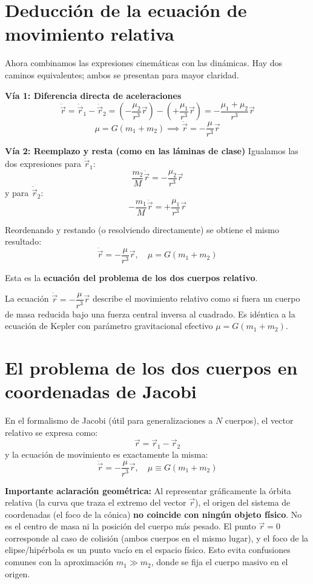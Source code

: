 \documentclass[12pt,oneside]{book}
\begin{document}
\section{Deducción de la ecuación de movimiento relativa}
Ahora combinamos las expresiones cinemáticas con las dinámicas. Hay dos caminos equivalentes; ambos se presentan para mayor claridad.

\textbf{Vía 1: Diferencia directa de aceleraciones}
\[
\ddot{\vec{r}} = \ddot{\vec{r}}_1 - \ddot{\vec{r}}_2 = \left( -\frac{\mu_2}{r^3} \vec{r} \right) - \left( +\frac{\mu_1}{r^3} \vec{r} \right) = -\frac{\mu_1 + \mu_2}{r^3} \vec{r}
\]
\[
\mu = G(m_1 + m_2) \implies \ddot{\vec{r}} = -\frac{\mu}{r^3} \vec{r}
\]

\textbf{Vía 2: Reemplazo y resta (como en las láminas de clase)}
Igualamos las dos expresiones para \(\ddot{\vec{r}}_1\):
\[
\frac{m_2}{M} \ddot{\vec{r}} = -\frac{\mu_2}{r^3} \vec{r}
\]
y para \(\ddot{\vec{r}}_2\):
\[
-\frac{m_1}{M} \ddot{\vec{r}} = +\frac{\mu_1}{r^3} \vec{r}
\]

Reordenando y restando (o resolviendo directamente) se obtiene el mismo resultado:
\[
\ddot{\vec{r}} = -\frac{\mu}{r^3} \vec{r}, \quad \mu = G(m_1 + m_2)
\]

Esta es la \textbf{ecuación del problema de los dos cuerpos relativo}.

\begin{importante}
La ecuación \(\ddot{\vec{r}} = -\dfrac{\mu}{r^3} \vec{r}\) describe el movimiento relativo como si fuera un cuerpo de masa reducida bajo una fuerza central inversa al cuadrado. Es idéntica a la ecuación de Kepler con parámetro gravitacional efectivo \(\mu = G(m_1 + m_2)\).
\end{importante}

\section{El problema de los dos cuerpos en coordenadas de Jacobi}
En el formalismo de Jacobi (útil para generalizaciones a \(N\) cuerpos), el vector relativo se expresa como:
\[
\vec{r} = \vec{r}_1 - \vec{r}_2
\]
y la ecuación de movimiento es exactamente la misma:
\[
\ddot{\vec{r}} = -\frac{\mu}{r^3} \vec{r}, \quad \mu \equiv G(m_1 + m_2)
\]

\textbf{Importante aclaración geométrica:}  
Al representar gráficamente la órbita relativa (la curva que traza el extremo del vector \(\vec{r}\)), el origen del sistema de coordenadas (el foco de la cónica) \textbf{no coincide con ningún objeto físico}. No es el centro de masa ni la posición del cuerpo más pesado. El punto \( \vec{r} = 0 \) corresponde al caso de colisión (ambos cuerpos en el mismo lugar), y el foco de la elipse/hipérbola es un punto vacío en el espacio físico. Esto evita confusiones comunes con la aproximación \(m_1 \gg m_2\), donde se fija el cuerpo masivo en el origen.
\end{document}

